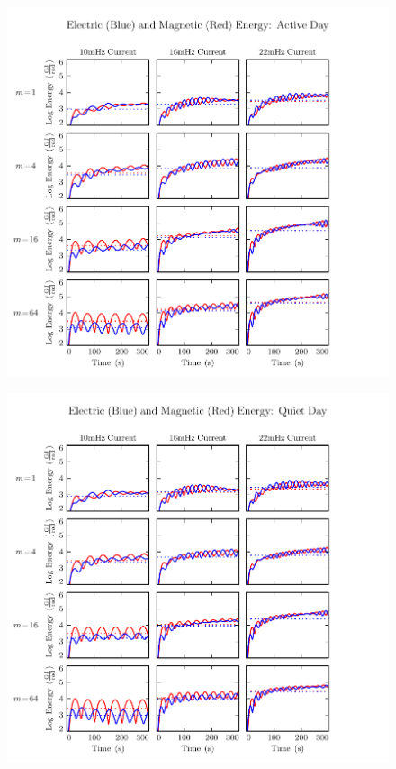 \begin{figure}[H]
    \centering
    \includegraphics[width=\textwidth]{figures/UB_UE_J_1.pdf}
    \caption[Current-Driven Electric and Magnetic Energy: Active Day]{}
    \label{fig_UB_UE_J_1}
\end{figure}

\begin{figure}[H]
    \centering
    \includegraphics[width=\textwidth]{figures/UB_UE_J_2.pdf}
    \caption[Current-Driven Electric and Magnetic Energy: Quiet Day]{}
    \label{fig_UB_UE_J_2}
\end{figure}

